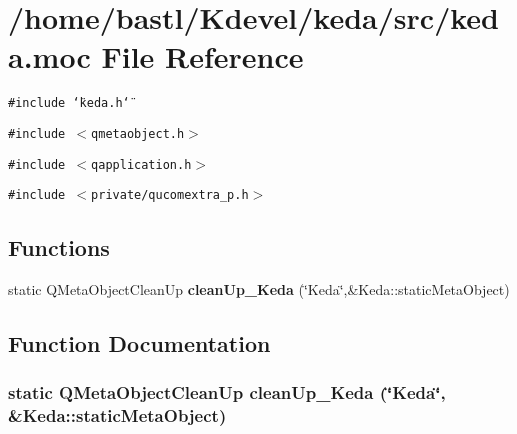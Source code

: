 \section{/home/bastl/Kdevel/keda/src/keda.moc File Reference}
\label{keda_8moc}
{\tt \#include \char`\"{}keda.h\char`\"{}}\par
{\tt \#include $<$qmetaobject.h$>$}\par
{\tt \#include $<$qapplication.h$>$}\par
{\tt \#include $<$private/qucomextra\_\-p.h$>$}\par
\subsection*{Functions}
\begin{CompactItemize}
\item 
static QMeta\-Object\-Clean\-Up {\bf clean\-Up\_\-Keda} (\char`\"{}Keda\char`\"{},\&Keda::static\-Meta\-Object)
\end{CompactItemize}


\subsection{Function Documentation}
\subsubsection{\setlength{\rightskip}{0pt plus 5cm}static QMeta\-Object\-Clean\-Up clean\-Up\_\-Keda (\char`\"{}Keda\char`\"{}, \&Keda::static\-Meta\-Object)\hspace{0.3cm}{\tt  [static]}}\label{keda_8moc_8da9b2edc76e2ae0b06161e90e990c82}


